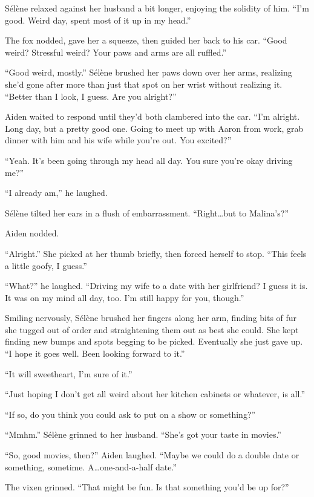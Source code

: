 Sélène relaxed against her husband a bit longer, enjoying the solidity of him. ``I'm good. Weird day, spent most of it up in my head.''

The fox nodded, gave her a squeeze, then guided her back to his car. ``Good weird? Stressful weird? Your paws and arms are all ruffled.''

``Good weird, mostly.'' Sélène brushed her paws down over her arms, realizing she'd gone after more than just that spot on her wrist without realizing it. ``Better than I look, I guess. Are you alright?''

Aiden waited to respond until they'd both clambered into the car. ``I'm alright. Long day, but a pretty good one. Going to meet up with Aaron from work, grab dinner with him and his wife while you're out. You excited?''

``Yeah. It's been going through my head all day. You sure you're okay driving me?''

``I already am,'' he laughed.

Sélène tilted her ears in a flush of embarrassment. ``Right\ldots{}but to Malina's?''

Aiden nodded.

``Alright.'' She picked at her thumb briefly, then forced herself to stop. ``This feels a little goofy, I guess.''

``What?'' he laughed. ``Driving my wife to a date with her girlfriend? I guess it is. It was on my mind all day, too. I'm still happy for you, though.''

Smiling nervously, Sélène brushed her fingers along her arm, finding bits of fur she tugged out of order and straightening them out as best she could. She kept finding new bumps and spots begging to be picked. Eventually she just gave up. ``I hope it goes well. Been looking forward to it.''

``It will sweetheart, I'm sure of it.''

``Just hoping I don't get all weird about her kitchen cabinets or whatever, is all.''

``If so, do you think you could ask to put on a show or something?''

``Mmhm.'' Sélène grinned to her husband. ``She's got your taste in movies.''

``So, good movies, then?'' Aiden laughed. ``Maybe we could do a double date or something, sometime. A\ldots{}one-and-a-half date.''

The vixen grinned. ``That might be fun. Is that something you'd be up for?''

